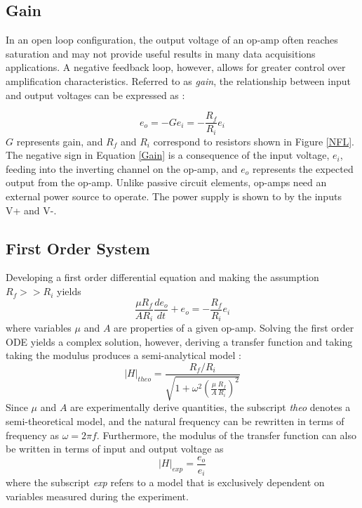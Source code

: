 \documentclass[letterpaper,12pt]{article}
\begin{document}
\subsection{Gain}
In an open loop configuration, the output voltage of an op-amp often reaches saturation and may not provide useful results in many data acquisitions applications. A negative feedback loop, however, allows for greater control over amplification characteristics. Referred to as \textit{gain}, the relationship between input and output voltages can be expressed as :

\begin{equation}
    \label{Gain}
    e_o = -Ge_i = -\frac{R_f}{R_i}e_i
\end{equation}
$G$ represents gain, and $R_f$ and $R_i$ correspond to resistors shown in Figure \ref{NFL}. The negative sign in Equation \ref{Gain} is a consequence of the input voltage, $e_i$, feeding into the inverting channel on the op-amp, and $e_o$ represents the expected output from the op-amp. Unlike passive circuit elements, op-amps need an external power source to operate. The power supply is shown to by the inputs V+ and V-.

\subsection{First Order System}
Developing a first order differential equation and making the assumption $R_f >> R_i$ yields 
\begin{equation}
    \label{1stOrder}
    \frac{\mu R_f}{A R_i}\frac{de_o}{dt} + e_o = -\frac{R_f}{R_i}e_i 
\end{equation}
where variables $\mu$ and $A$ are properties of a given op-amp. Solving the first order ODE yields a complex solution, however, deriving a transfer function and taking taking the modulus produces a semi-analytical model : 
\begin{equation}
    \label{Htheo}
    |H|_{theo} = \frac{R_f/R_i}{\sqrt{1 + \omega^2(\frac{\mu}{A}\frac{R_f}{R_i})^2}}
\end{equation}
Since $\mu$ and $A$ are experimentally derive quantities, the subscript \textit{theo} denotes a semi-theoretical model, and the natural frequency can be rewritten in terms of frequency as $\omega = 2\pi f$. Furthermore, the modulus of the transfer function can also be written in terms of input and output voltage as
\begin{equation}
    \label{Hexp}
    |H|_{exp} = \frac{e_o}{e_i}
\end{equation}
where the subscript \textit{exp} refers to a model that is exclusively dependent on variables measured during the experiment.
\end{document}
